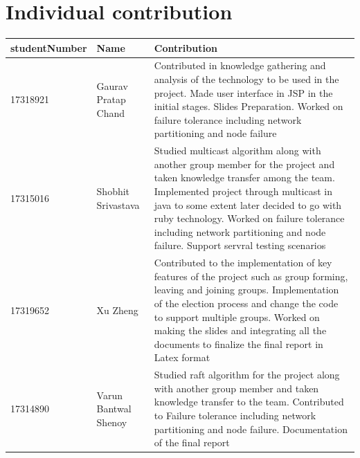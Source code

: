 \documentclass[a4paper,11pt]{article}
\begin{document}
\section{Individual contribution}
\begin{center}
    \begin{tabular}{ | l | l | p{5cm} |} \hline
    studentNumber & Name & Contribution\\ \hline
    17318921 & Gaurav Pratap Chand &Contributed in knowledge gathering and analysis of the technology to be used in the project. Made user interface in JSP in the initial stages. Slides Preparation. Worked on failure tolerance including network partitioning and node failure\\ \hline
    17315016 & Shobhit Srivastava & Studied multicast algorithm along with another group member for the project and taken knowledge transfer among the team. Implemented project through multicast in java to some extent later decided to go with ruby technology. Worked on failure tolerance including network partitioning and node failure. Support servral testing scenarios \\ \hline
    17319652 & Xu Zheng & Contributed to the implementation of key features of the project such as group forming, leaving and joining groups. Implementation of the election process and change the code to support multiple groups. Worked on making the slides and integrating all the documents to finalize the final report in Latex format \\ \hline
    17314890 & Varun Bantwal Shenoy & Studied raft algorithm for the project along with another group member and taken knowledge transfer to the team. Contributed to Failure tolerance including network partitioning and node failure. Documentation of the final report\\ \hline
    \end{tabular}
\end{center}
\end{document}
